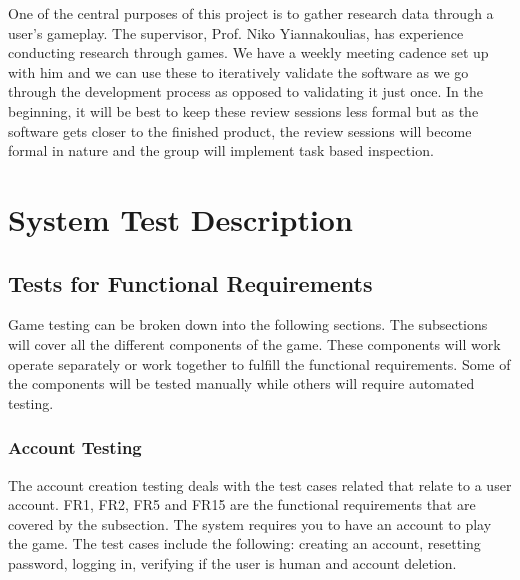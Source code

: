\documentclass[12pt, titlepage]{article}
\begin{document}

One of the central purposes of this project is to gather research data through a user's gameplay. The supervisor, Prof. Niko Yiannakoulias, has experience conducting research through games. We have a weekly meeting cadence set up with him and we can use these to iteratively validate the software as we go through the development process as opposed to validating it just once. In the beginning, it will be best to keep these review sessions less formal but as the software gets closer to the finished product, the review sessions will become formal in nature and the group will implement task based inspection.

\section{System Test Description}
	
\subsection{Tests for Functional Requirements}
\label{s5.1}

Game testing can be broken down into the following sections. The subsections will cover all the different components of the game. These components will work operate separately or work together to fulfill the functional requirements. Some of the components will be tested manually while others will require automated testing.


\subsubsection{Account Testing}

The account creation testing deals with the test cases related that relate to a user account. FR1, FR2, FR5 and FR15 are the functional requirements that are covered by the subsection. The system requires you to have an account to play the game. The test cases include the following: creating an account, resetting password, logging in, verifying if the user is human and account deletion.
\end{document}
